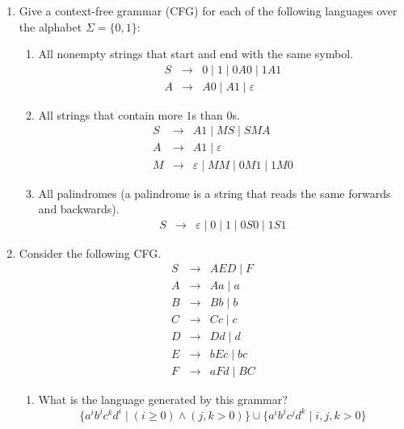 \documentclass[11pt]{article}
\begin{document}

\begin{enumerate}

\item
Give a context-free grammar (CFG) for each of the following languages
over the alphabet $\Sigma = \{0, 1\}$:
\begin{enumerate}
\item All nonempty strings that start and end with the same symbol.
\begin{eqnarray*}
S & \rightarrow & 0 \mid 1 \mid 0A0 \mid 1A1 \\
A & \rightarrow & A0 \mid A1 \mid \varepsilon
\end{eqnarray*}
\item All strings that contain more $1$s than $0$s.
\begin{eqnarray*}
S & \rightarrow & A1 \mid MS \mid SMA \\
A & \rightarrow & A1 \mid \varepsilon \\
M & \rightarrow & \varepsilon \mid MM \mid 0M1 \mid 1M0
\end{eqnarray*}
\item All palindromes (a palindrome is a string that reads the same
forwards and backwards).
\begin{eqnarray*}
S & \rightarrow & \varepsilon \mid 0 \mid 1 \mid 0S0 \mid 1S1
\end{eqnarray*}
\end{enumerate}

\item Consider the following CFG.
\begin{eqnarray*}
S & \rightarrow & AED \mid F \\
A & \rightarrow & Aa \mid a \\
B & \rightarrow & Bb \mid b \\
C & \rightarrow & Cc \mid c \\
D & \rightarrow & Dd \mid d \\
E & \rightarrow & bEc \mid bc \\
F & \rightarrow & aFd \mid BC
\end{eqnarray*}

\begin{enumerate}

\item What is the language generated by this grammar?
\[
\{a^{i}b^{j}c^{k}d^{i} \mid (i \geq 0) \land (j, k > 0)\}
\cup \{a^{i}b^{j}c^{j}d^{k} \mid i, j, k > 0\}
\]


\end{enumerate}
\end{enumerate}
\end{document}
